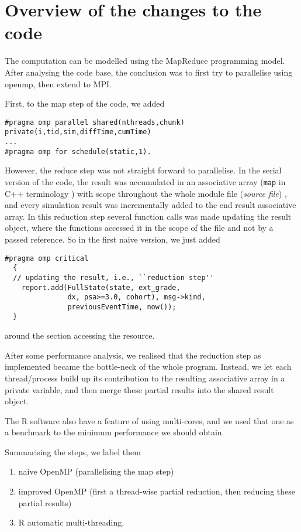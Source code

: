 
\section{Overview of the changes to the code}

The computation can be modelled using the MapReduce programming model. After
analysing the code base, the conclusion was to first try to
parallelise using openmp, then extend to MPI.

First, to the map step of the code, we added
\begin{lstlisting}
#pragma omp parallel shared(nthreads,chunk) private(i,tid,sim,diffTime,cumTime)
...
#pragma omp for schedule(static,1).
\end{lstlisting}
However, the reduce step was not straight forward to parallelise. In
the serial version of the code, the result was accumulated in an associative array (\texttt{map} in
C++ terminology ) with scope throughout the whole module file (\emph{source
  file}) , and every simulation result was incrementally added to the end
result associative array. In this reduction step several function calls was made
updating the result object, where the functions accessed it in the scope of
the file and not by a passed reference. So in the first naive version, we
just added \lstset{language=C++}
\begin{lstlisting}
#pragma omp critical
  {
  // updating the result, i.e., ``reduction step''
    report.add(FullState(state, ext_grade,
               dx, psa>=3.0, cohort), msg->kind,
               previousEventTime, now());
  }
\end{lstlisting}
around the section accessing the resource.

After some performance analysis, we realised that the reduction step
as implemented became the bottle-neck of the whole program. Instead,
we let each thread/process build up its contribution to the resulting
associative array in a private variable, and then merge these partial
results into the shared result object.

The R software also have a feature of using multi-cores, and we used
that one as a benchmark to the minimum performance we should obtain.

Summarising the steps, we label them
\begin{enumerate}
\item naive OpenMP (parallelising the map step)
\item improved OpenMP (first a thread-wise partial reduction, then
  reducing these partial results)
\item R automatic multi-threading.
\end{enumerate}


